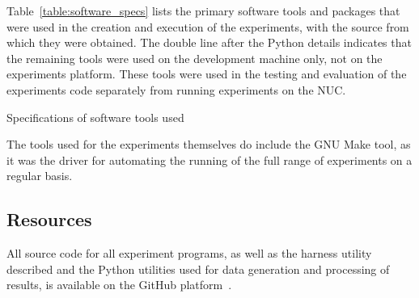 Table~\ref{table:software_specs} lists the primary software tools and packages that were used in the creation and execution of the experiments, with the source from which they were obtained. The double line after the Python details indicates that the remaining tools were used on the development machine only, not on the experiments platform. These tools were used in the testing and evaluation of the experiments code separately from running experiments on the NUC.

\begin{table}[h!]
\begin{center}

\caption{Specifications of software tools used}
\label{table:software_specs}
\end{center}
\end{table}

The tools used for the experiments themselves do include the GNU Make tool, as it was the driver for automating the running of the full range of experiments on a regular basis.

\subsection{Resources}

All source code for all experiment programs, as well as the harness utility described and the Python utilities used for data generation and processing of results, is available on the GitHub platform~\cite{github}.
